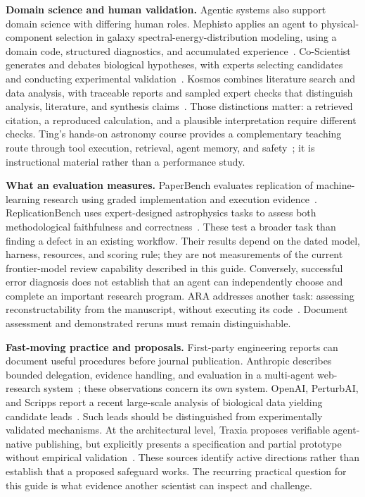 \documentclass[aps,prd,reprint,nofootinbib]{revtex4-2}
\begin{document}
\textbf{Domain science and human validation.} Agentic systems also support domain science with differing human roles. Mephisto applies an agent to physical-component selection in galaxy spectral-energy-distribution modeling, using a domain code, structured diagnostics, and accumulated experience~\cite{Mephisto}. Co-Scientist generates and debates biological hypotheses, with experts selecting candidates and conducting experimental validation~\cite{CoScientist}. Kosmos combines literature search and data analysis, with traceable reports and sampled expert checks that distinguish analysis, literature, and synthesis claims~\cite{Kosmos}. Those distinctions matter: a retrieved citation, a reproduced calculation, and a plausible interpretation require different checks. Ting's hands-on astronomy course provides a complementary teaching route through tool execution, retrieval, agent memory, and safety~\cite{TingCourse}; it is instructional material rather than a performance study.

\textbf{What an evaluation measures.} PaperBench evaluates replication of machine-learning research using graded implementation and execution evidence~\cite{PaperBench}. ReplicationBench uses expert-designed astrophysics tasks to assess both methodological faithfulness and correctness~\cite{ReplicationBench}. These test a broader task than finding a defect in an existing workflow. Their results depend on the dated model, harness, resources, and scoring rule; they are not measurements of the current frontier-model review capability described in this guide. Conversely, successful error diagnosis does not establish that an agent can independently choose and complete an important research program. ARA addresses another task: assessing reconstructability from the manuscript, without executing its code~\cite{ARA}. Document assessment and demonstrated reruns must remain distinguishable.

\textbf{Fast-moving practice and proposals.} First-party engineering reports can document useful procedures before journal publication. Anthropic describes bounded delegation, evidence handling, and evaluation in a multi-agent web-research system~\cite{AnthropicResearch}; these observations concern its own system. OpenAI, PerturbAI, and Scripps report a recent large-scale analysis of biological data yielding candidate leads~\cite{OpenAIBiology}. Such leads should be distinguished from experimentally validated mechanisms. At the architectural level, Traxia proposes verifiable agent-native publishing, but explicitly presents a specification and partial prototype without empirical validation~\cite{Traxia}. These sources identify active directions rather than establish that a proposed safeguard works. The recurring practical question for this guide is what evidence another scientist can inspect and challenge.
\end{document}
